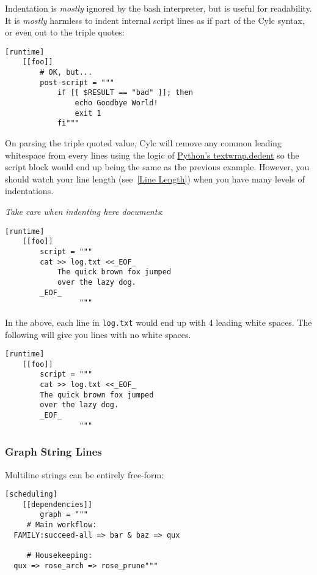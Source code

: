 Indentation is {\em mostly} ignored by the bash interpreter, but is useful for
readability. It is {\em mostly} harmless to indent internal script lines as if
part of the Cylc syntax, or even out to the triple quotes:

\lstset{language=suiterc}
\begin{lstlisting}
[runtime]
    [[foo]]
        # OK, but...
        post-script = """
            if [[ $RESULT == "bad" ]]; then
                echo Goodbye World!
                exit 1
            fi"""
\end{lstlisting}

On parsing the triple quoted value, Cylc will remove any common leading
whitespace from every lines using the logic of
\href{https://docs.python.org/2/library/textwrap.html#textwrap.dedent}{Python's textwrap.dedent}
so the script block would end up being the same as the previous example.
However, you should watch your line length (see~\ref{Line Length}) when you
have many levels of indentations.

{\em Take care when indenting here documents}:

\lstset{language=suiterc}
\begin{lstlisting}
[runtime]
    [[foo]]
        script = """
        cat >> log.txt <<_EOF_
            The quick brown fox jumped
            over the lazy dog.
        _EOF_
                 """
\end{lstlisting}

In the above, each line in \lstinline=log.txt= would end up with 4 leading
white spaces. The following will give you lines with no white spaces.

\lstset{language=suiterc}
\begin{lstlisting}
[runtime]
    [[foo]]
        script = """
        cat >> log.txt <<_EOF_
        The quick brown fox jumped
        over the lazy dog.
        _EOF_
                 """
\end{lstlisting}

\subsubsection{Graph String Lines}

Multiline \lstinline@graph@ strings can be entirely free-form:

\lstset{language=suiterc}
\begin{lstlisting}
[scheduling]
    [[dependencies]]
        graph = """
     # Main workflow:
  FAMILY:succeed-all => bar & baz => qux

     # Housekeeping:
  qux => rose_arch => rose_prune"""
\end{lstlisting}

